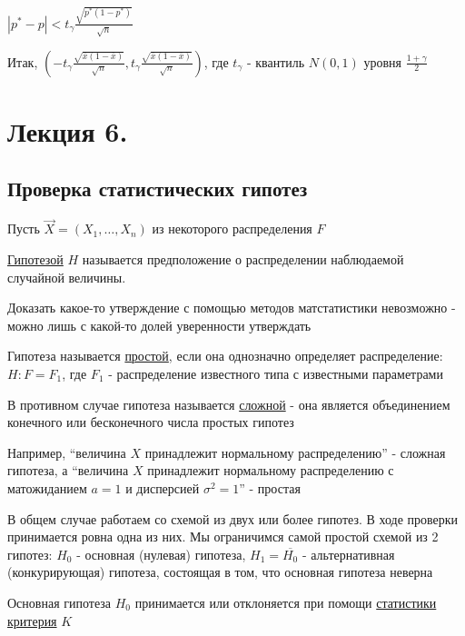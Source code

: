 \documentclass[12pt]{article}
\begin{document}
$|p^* - p| < t_\gamma \frac{\sqrt{p^* (1 - p^*)}}{\sqrt{n}}$

Итак, $\left(-t_\gamma \frac{\sqrt{\overline{x} (1 - \overline{x})}}{\sqrt{n}}, t_\gamma \frac{\sqrt{\overline{x} (1 - \overline{x})}}{\sqrt{n}}\right)$, где $t_\gamma$ - квантиль $N(0, 1)$ уровня $\frac{1 + \gamma}{2}$






\section{Лекция 6.}

\subsection{Проверка статистических гипотез}

\hypertarget{hypothesis}{}

Пусть $\vec X = (X_1, \dots, X_n)$ из некоторого распределения $F$

\Def \underline{Гипотезой} $H$ называется предположение о распределении наблюдаемой случайной величины. 

Доказать какое-то утверждение с помощью методов матстатистики невозможно - можно лишь с какой-то долей 
уверенности утверждать

\Def Гипотеза называется \underline{простой}, если она однозначно определяет распределение: 
$H : F = F_1$, где $F_1$ - распределение известного типа с известными параметрами

В противном случае гипотеза называется \underline{сложной} - она является объединением конечного или бесконечного числа
простых гипотез

Например, \enquote{величина $X$ принадлежит нормальному распределению} - сложная гипотеза, а 
\enquote{величина $X$ принадлежит нормальному распределению с матожиданием $a = 1$ и дисперсией $\sigma^2 = 1$} - простая


В общем случае работаем со схемой из двух или более гипотез. В ходе проверки принимается ровна одна из них.
Мы ограничимся самой простой схемой из 2 гипотез: $H_0$ - основная (нулевая) гипотеза, $H_1 = \overline{H_0}$ - 
альтернативная (конкурирующая) гипотеза, состоящая в том, что основная гипотеза неверна

Основная гипотеза $H_0$ принимается или отклоняется при помощи \underline{статистики критерия} $K$ 
\end{document}

